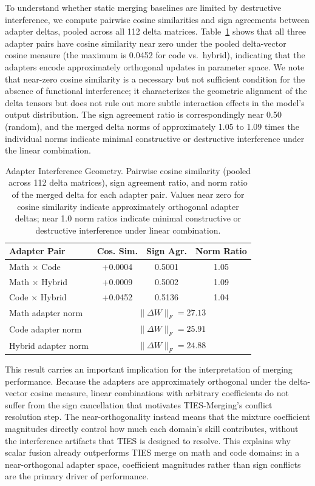 \documentclass[preprint,12pt]{elsarticle}
\begin{document}
To understand whether static merging baselines are limited by destructive
interference, we compute pairwise cosine similarities and sign agreements
between adapter deltas, pooled across all 112 delta matrices. Table~\ref{tab:geometry}
shows that all three adapter pairs have cosine similarity near zero under the
pooled delta-vector cosine measure (the maximum is 0.0452 for code vs.\ hybrid),
indicating that the adapters encode approximately orthogonal updates in
parameter space. We note that near-zero cosine similarity is a necessary but
not sufficient condition for the absence of functional interference; it
characterizes the geometric alignment of the delta tensors but does not
rule out more subtle interaction effects in the model's output distribution.
The sign agreement ratio is correspondingly near 0.50 (random), and the merged
delta norms of approximately 1.05 to 1.09 times the individual norms indicate
minimal constructive or destructive interference under the linear combination.

\begin{table}[t]
\centering
\caption{Adapter Interference Geometry. Pairwise cosine similarity (pooled across 112 delta matrices), sign agreement ratio, and norm ratio of the merged delta for each adapter pair. Values near zero for cosine similarity indicate approximately orthogonal adapter deltas; near 1.0 norm ratios indicate minimal constructive or destructive interference under linear combination.}
\label{tab:geometry}
\begin{tabular}{lccc}
\toprule
\textbf{Adapter Pair} &
\textbf{Cos. Sim.} & \textbf{Sign Agr.} & \textbf{Norm Ratio} \\
\midrule
Math $\times$ Code   & +0.0004 & 0.5001 & 1.05 \\
Math $\times$ Hybrid & +0.0009 & 0.5002 & 1.09 \\
Code $\times$ Hybrid & +0.0452 & 0.5136 & 1.04 \\
\midrule
Math adapter norm    & \multicolumn{3}{c}{$\|\Delta W\|_F = 27.13$} \\
Code adapter norm    & \multicolumn{3}{c}{$\|\Delta W\|_F = 25.91$} \\
Hybrid adapter norm  & \multicolumn{3}{c}{$\|\Delta W\|_F = 24.88$} \\
\bottomrule
\end{tabular}
\end{table}

This result carries an important implication for the interpretation of merging
performance. Because the adapters are approximately orthogonal under the
delta-vector cosine measure, linear combinations with arbitrary coefficients
do not suffer from the sign cancellation that motivates TIES-Merging's conflict
resolution step. The near-orthogonality instead means that the mixture
coefficient magnitudes directly control how much each domain's skill
contributes, without the interference artifacts that TIES is designed to
resolve. This explains why scalar fusion already outperforms TIES merge on
math and code domains: in a near-orthogonal adapter space, coefficient
magnitudes rather than sign conflicts are the primary driver of performance.
\end{document}
